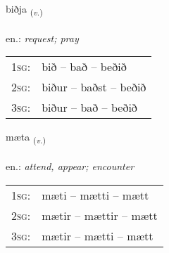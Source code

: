 \documentclass[frontgrid, backgrid]{flacards}\usepackage[]{graphicx}\usepackage[]{xcolor}
\begin{document}
\renewcommand{\blhead}{\vskip5pt {\small\bfseries\footnotesize Sagnorð | Verb }}
\renewcommand{\bcfoot}{\vskip5pt \hspace{2pt}{\small\bfseries\footnotesize 1K}}


{biðja \small{\textsubscript{(\textit{v.})}} \\[1ex] %
\textphonetic{[pɪðja]} \\
en.: \emph{request; pray} \\  [2ex]
\renewcommand*{\arraystretch}{0.8}
\begin{tabular}{p{1cm}l}
\textsc{1sg}: & bið -- bað -- beðið \\ 
\textsc{2sg}: & biður -- baðst -- beðið \\ 
\textsc{3sg}: & biður -- bað -- beðið \\ 
\end{tabular}
}

\renewcommand{\flhead}{\vskip5pt \fboxsep=0pt {\small\bfseries\footnotesize Sagnorð | Verb}}
\renewcommand{\fcfoot}{\vskip5pt \fboxsep=0pt \hspace{2pt}{\small\bfseries\footnotesize 1K}}

\renewcommand{\blhead}{\vskip5pt {\small\bfseries\footnotesize Sagnorð | Verb }}
\renewcommand{\bcfoot}{\vskip5pt \hspace{2pt}{\small\bfseries\footnotesize 1K}}


{mæta \small{\textsubscript{(\textit{v.})}} \\[1ex] %
\textphonetic{[maiːta]} \\
en.: \emph{attend, appear; encounter} \\  [2ex]
\renewcommand*{\arraystretch}{0.8}
\begin{tabular}{p{1cm}l}
\textsc{1sg}: & mæti -- mætti -- mætt \\ 
\textsc{2sg}: & mætir -- mættir -- mætt \\ 
\textsc{3sg}: & mætir -- mætti -- mætt \\ 
\end{tabular}
}
\end{document}
